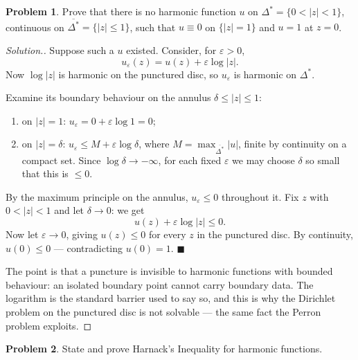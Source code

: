\documentclass[11pt,a4paper]{article}
\theoremstyle{definition}
\newtheorem{problemx}{Problem}[section]
\newenvironment{problem}{\begin{problemx}}{\end{problemx}}
\newenvironment{solution}
  {\renewcommand{\qedsymbol}{}\begin{proof}[\textit{Solution}.]}
  {\end{proof}}
\begin{document}
\begin{problem}
Prove that there is no harmonic function $u$ on
$\Delta^{*} = \{0 < \left|z\right| < 1\}$, continuous on
$\overline{\Delta^{*}} = \{\left|z\right| \leq 1\}$, such that $u \equiv 0$ on
$\{\left|z\right| = 1\}$ and $u = 1$ at $z = 0$.
\end{problem}

\begin{solution}
Suppose such a $u$ existed. Consider, for $\varepsilon > 0$,
$$u_{\varepsilon}(z) = u(z) + \varepsilon \log\left|z\right| .$$
Now $\log\left|z\right|$ is harmonic on the punctured disc, so $u_\varepsilon$ is
harmonic on $\Delta^{*}$.

Examine its boundary behaviour on the annulus
$\delta \leq \left|z\right| \leq 1$:
\begin{enumerate}
\item[-] on $\left|z\right| = 1$: $u_\varepsilon = 0 + \varepsilon\log 1 = 0$;
\item[-] on $\left|z\right| = \delta$: $u_\varepsilon \leq M + \varepsilon\log\delta$,
where $M = \max_{\overline{\Delta^{*}}}\left|u\right|$, finite by continuity on a
compact set. Since $\log\delta \rightarrow -\infty$, for each fixed $\varepsilon$
we may choose $\delta$ so small that this is $\leq 0$.
\end{enumerate}
By the maximum principle on the annulus, $u_\varepsilon \leq 0$ throughout it. Fix
$z$ with $0 < \left|z\right| < 1$ and let $\delta \rightarrow 0$: we get
$$u(z) + \varepsilon\log\left|z\right| \leq 0 .$$
Now let $\varepsilon \rightarrow 0$, giving $u(z) \leq 0$ for every $z$ in the
punctured disc. By continuity, $u(0) \leq 0$ --- contradicting $u(0) = 1$.
$\blacksquare$

The point is that a puncture is invisible to harmonic functions with bounded
behaviour: an isolated boundary point cannot carry boundary data. The logarithm is
the standard barrier used to say so, and this is why the Dirichlet problem on the
punctured disc is not solvable --- the same fact the Perron problem exploits.
\end{solution}


\begin{problem}
State and prove Harnack's Inequality for harmonic functions.
\end{problem}
\end{document}
